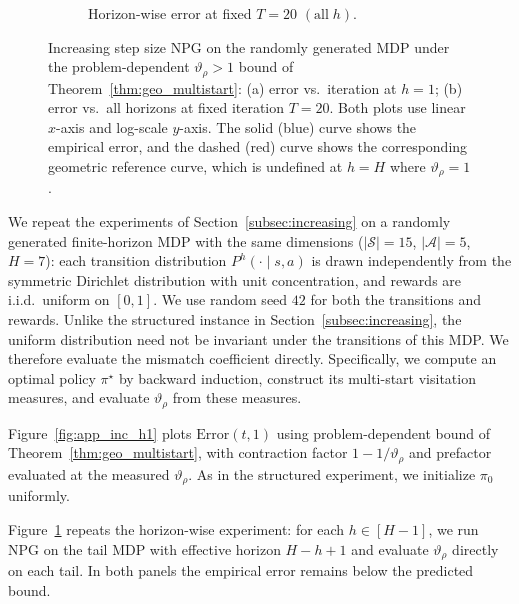 \documentclass[11pt]{article}
\begin{document}
\begin{figure}[htbp]
\begin{subfigure}[t]{0.48\linewidth}
        \caption{Horizon-wise error at fixed $T=20$ $(\text{all}\; h)$.}
        \label{fig:app_inc_all_h} 
    \end{subfigure}

    \caption{Increasing step size NPG on the randomly generated MDP under the problem-dependent $\vartheta_\rho > 1$ bound of Theorem~\ref{thm:geo_multistart}: (a) error vs.\ iteration at $h=1$; (b) error vs.\ all horizons at fixed iteration $T=20$. Both plots use linear $x$-axis and log-scale $y$-axis. The solid (blue) curve shows the empirical error, and the dashed (red) curve shows the corresponding geometric reference curve, which is undefined at $h=H$ where $\vartheta_\rho=1$.}
    \label{fig:increasing_h1_subfigures}
\end{figure}

We repeat the experiments of Section~\ref{subsec:increasing} on a randomly
generated finite-horizon MDP with the same dimensions
($|\mathcal{S}| = 15$, $|\mathcal{A}| = 5$, $H = 7$): each transition
distribution $P^h(\cdot \mid s, a)$ is drawn independently from the
symmetric Dirichlet distribution with unit concentration, and rewards are
i.i.d.\ uniform on $[0,1]$.  We use random seed $42$ for both the transitions
and rewards. Unlike the structured instance in Section~\ref{subsec:increasing}, the
uniform distribution need not be invariant under the transitions of this
MDP. We therefore evaluate the mismatch coefficient directly. Specifically,
we compute an optimal policy $\pi^\star$ by backward induction, construct
its multi-start visitation measures, and evaluate $\vartheta_\rho$ from these measures.

Figure~\ref{fig:app_inc_h1} plots $\mathrm{Error}(t,1)$ using problem-dependent bound of Theorem~\ref{thm:geo_multistart}, with
contraction factor $1 - 1/\vartheta_\rho$ and prefactor evaluated at the
measured $\vartheta_\rho$. As in the structured
experiment, we initialize $\pi_0$ uniformly.

Figure~\ref{fig:app_inc_all_h} repeats the
horizon-wise experiment: for each $h \in [H-1]$, we run NPG on the tail MDP with effective
horizon $H-h+1$ and evaluate $\vartheta_\rho$ directly on each tail. In both panels the empirical error remains below the predicted
bound.
\end{document}

